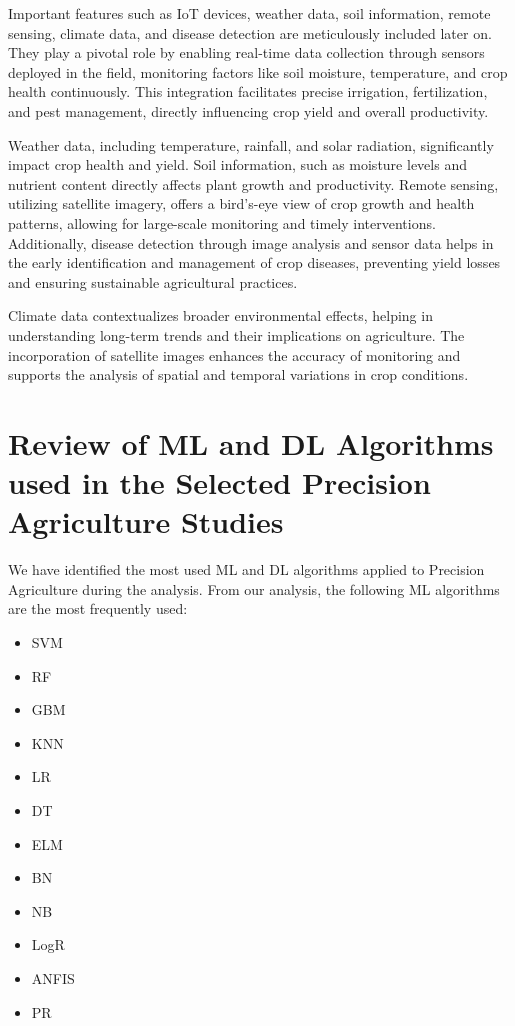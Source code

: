 \documentclass[conference]{IEEEtran}
\begin{document}
Important features such as IoT devices, weather data, soil information, remote sensing, climate data, and disease detection are meticulously included later on. They play a pivotal role by enabling real-time data collection through sensors deployed in the field, monitoring factors like soil moisture, temperature, and crop health continuously. This integration facilitates precise irrigation, fertilization, and pest management, directly influencing crop yield and overall productivity.

Weather data, including temperature, rainfall, and solar radiation, significantly impact crop health and yield. Soil information, such as moisture levels and nutrient content directly affects plant growth and productivity. Remote sensing, utilizing satellite imagery, offers a bird's-eye view of crop growth and health patterns, allowing for large-scale monitoring and timely interventions. Additionally, disease detection through image analysis and sensor data helps in the early identification and management of crop diseases, preventing yield losses and ensuring sustainable agricultural practices.

Climate data contextualizes broader environmental effects, helping in understanding long-term trends and their implications on agriculture. The incorporation of satellite images enhances the accuracy of monitoring and supports the analysis of spatial and temporal variations in crop conditions.

\section{Review of ML and DL Algorithms used in the Selected Precision Agriculture Studies}

We have identified the most used ML and DL algorithms applied to Precision Agriculture during the analysis. From our analysis, the following ML algorithms are the most frequently used: 

\begin{itemize}
\item SVM
\item RF
\item GBM
\item KNN
\item LR
\item DT
\item ELM
\item BN
\item NB
\item LogR
\item ANFIS
\item PR
\end{itemize}
\end{document}
